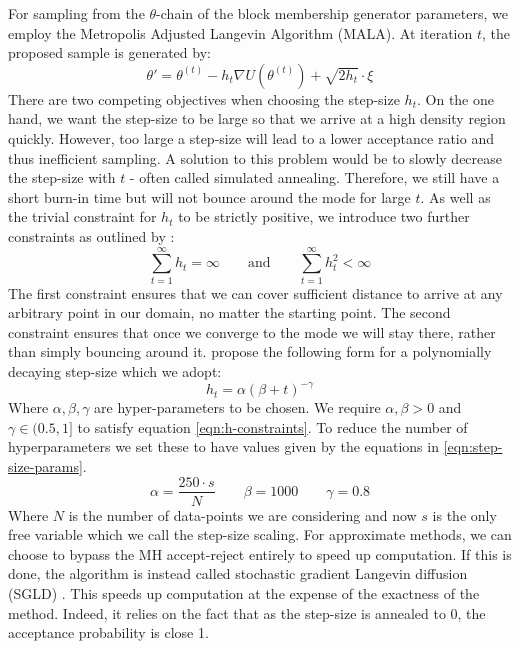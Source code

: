 For sampling from the $\theta$-chain of the block membership generator parameters, we employ the Metropolis Adjusted Langevin Algorithm (MALA). At iteration $t$, the proposed sample is generated by:
%
\begin{equation}
	\theta' = \theta^{(t)} - h_t \nabla U(\theta^{(t)}) + \sqrt{2h_t} \cdot \xi
\end{equation}
%
There are two competing objectives when choosing the step-size $h_t$. On the one hand, we want the step-size to be large so that we arrive at a high density region quickly. However, too large a step-size will lead to a lower acceptance ratio and thus inefficient sampling. A solution to this problem would be to slowly decrease the step-size with $t$ - often called simulated annealing. Therefore, we still have a short burn-in time but will not bounce around the mode for large $t$. As well as the trivial constraint for $h_t$ to be strictly positive, we introduce two further constraints as outlined by \citet{Bayesian-SGLD}:
%
\begin{equation}
	\sum_{t=1}^{\infty} h_t = \infty \qquad \textrm{and} \qquad
	\sum_{t=1}^{\infty} h_t^2 < \infty
	\label{eqn:h-constraints}
\end{equation}
%
The first constraint ensures that we can cover sufficient distance to arrive at any arbitrary point in our domain, no matter the starting point. The second constraint ensures that once we converge to the mode we will stay there, rather than simply bouncing around it. \citet{Bayesian-SGLD} propose the following form for a polynomially decaying step-size which we adopt:
%
\begin{equation}
	h_t = \alpha(\beta + t)^{-\gamma}
\end{equation}
%
Where $\alpha, \beta, \gamma$ are hyper-parameters to be chosen. We require $\alpha,\beta > 0$ and $\gamma \in (0.5, 1]$ to satisfy equation \ref{eqn:h-constraints}. To reduce the number of hyperparameters we set these to have values given by the equations in \ref{eqn:step-size-params}.
%
\begin{equation}
	\alpha = \frac{250 \cdot s}{N} \qquad \beta = 1000 \qquad \gamma = 0.8
	\label{eqn:step-size-params}
\end{equation}
%
Where $N$ is the number of data-points we are considering and now $s$ is the only free variable which we call the step-size scaling. For approximate methods, we can choose to bypass the MH accept-reject entirely to speed up computation. If this is done, the algorithm is instead called stochastic gradient Langevin diffusion (SGLD) \cite{Bayesian-SGLD}. This speeds up computation at the expense of the exactness of the method. Indeed, it relies on the fact that as the step-size is annealed to 0, the acceptance probability is close 1.

